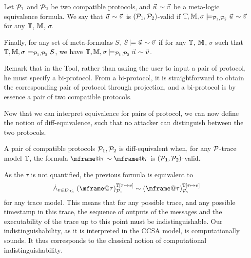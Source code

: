 \begin{definition}
  Let $\mathcal{P}_1$ and $\mathcal{P}_2$ be two compatible protocols, and
  $\pvec{u} \sim \pvec{v}$ be a meta-logic equivalence formula. 
%
 We say that $\pvec{u} \sim \pvec{v}$ is $(\mathcal{P}_1,\mathcal{P}_2)$-valid if $\TM, \Mo, \sigma \models_{\calp_1,\calp_2} \pvec{u} \sim \pvec{v}$ for any $\mathbb{T}$, $\mathbb{M}$, $\sigma$.

  Finally, for any set of meta-formulas $S$, $S \models \pvec{u} \sim \pvec{v}$ if for any $\mathbb{T}$, $\mathbb{M}$, $\sigma$ such that $\mathbb{T}, \mathbb{M}, \sigma \models_{\mathcal{P}_1,\mathcal{P}_2} S$, we have $\TM, \Mo, \sigma \models_{\calp_1,\calp_2} \pvec{u} \sim \pvec{v}$.
\end{definition}


Remark that in the Tool, rather than asking the user to input a pair of protocol, he must specify a bi-protocol. From a bi-protocol, it is straightforward to obtain the corresponding pair of protocol through projection, and a bi-protocol is by essence a pair of two compatible protocols.


Now that we can interpret equivalence for pairs of protocol, we can now define the notion of diff-equivalence, such that no attacker can distinguish between the two protocols.

\begin{definition}
  \label{def:process-equiv}
  A pair of compatible protocols $\mathcal{P}_1,\mathcal{P}_2$ is diff-equivalent when,
  for any $\mathcal{P}$-trace model $\mathbb{T}$, the formula $\mframe@\tau  \sim \mframe@\tau$ is $(\mathcal{P}_1,\mathcal{P}_2)$-valid.
\end{definition}

As the $\tau$ is not quantified, the previous formula is equivalent to  \[
    \dand_{v\in D_\XT}
    \interp{\mframe@\tau}{\TM[\tau\mapsto v]}{\calp_1}
    \sim
    \interp{\mframe@\tau}{\TM[\tau \mapsto v]}{\calp_2}
  \]
  for any trace model.
This means that for any possible trace, and any possible timestamp in this trace, the sequence of outputs of the messages and the executability of the trace up to this point must be indistinguishable. Our indistinguishability, as it is interpreted in the CCSA model, is computationally sounds. It thus corresponds to the classical notion of computational indistinguishability.

